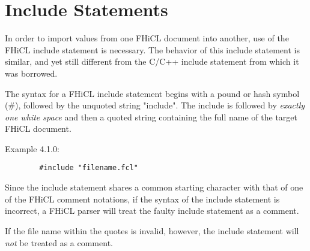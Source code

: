 \documentclass{article}
\begin{document}
\section{Include Statements}
	In order to import values from one FHiCL document into another,
	use of the FHiCL include statement is necessary.
	The behavior of this include statement is similar,
	and yet still different from the C/C++ include statement from which it was borrowed.
	\par
	The syntax for a FHiCL include statement begins with a pound or hash symbol (\#),
	followed by the unquoted string "include".
	The include is followed by \emph{exactly one white space}
	and then a quoted string containing the full name of the target FHiCL document.
	\par
	Example 4.1.0:
	\begin{verbatim}
		#include "filename.fcl"
	\end{verbatim}	
	\par
	Since the include statement shares a common starting character with that of one of the FHiCL comment notations,
	if the syntax of the include statement is incorrect,
	a FHiCL parser will treat the faulty include statement as a comment.
	\par
	If the file name within the quotes is invalid, however, the include statement will \emph{not} be treated as a comment.
\end{document}

